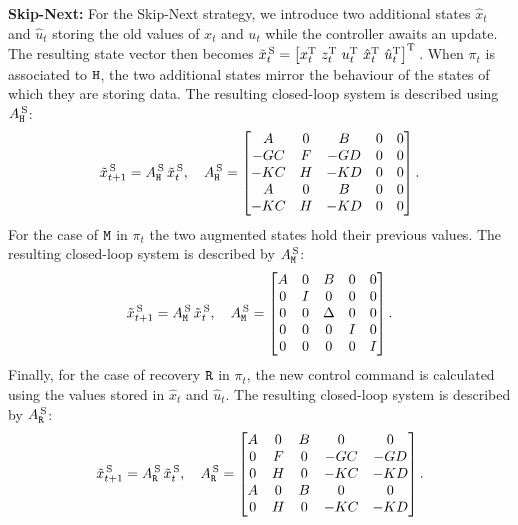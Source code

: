\textbf{Skip-Next: }%
%
For the Skip-Next strategy, we introduce two additional states $\hat x_t$ and $\hat u_t$ storing the old values of $x_t$ and $u_t$ while the controller awaits an update.
The resulting state vector then becomes $\tilde x_t^{\,\text{S}} = \left[ x_t^{\mathrm{\small{T}}}{}\,\,z_t^{\mathrm{\small{T}}}{}\,\, u_t^{\mathrm{\small{T}}}{}\,\, \hat{x}_t^{\mathrm{\small{T}}}{}\,\, \hat{u}_t^{\mathrm{\small{T}}}{} \right]^{\mathrm{\small{T}}}{}$.
When $\pi_t$ is associated to $\texttt{H}$, the two additional states mirror the behaviour of the states of which they are storing data.
The resulting closed-loop system is described using $A^{\,\text{S}}_{\texttt{H}}$:
\begin{equation*}
    \tilde x_{t+1}^{\,\text{S}} = A^{\,\text{S}}_{\texttt{H}}\,\tilde x_t^{\,\text{S}}, \quad
    A^{\,\text{S}}_{\texttt{H}} = \begin{bmatrix}
        A       & 0    & B      & 0 & 0 \\
        -GC   & F  & -GD  & 0 & 0 \\
        -KC   & H  & -KD  & 0 & 0 \\
        A       & 0    & B      & 0 & 0 \\
        -KC   & H  & -KD  & 0 & 0 \\
    \end{bmatrix}.
\end{equation*}
%
For the case of $\texttt{M}$ in $\pi_t$ the two augmented states hold their previous values.
The resulting closed-loop system is described by $A^{\,\text{S}}_{\texttt{M}}$:
%
\begin{equation*}
    \tilde x_{t+1}^{\,\text{S}} = A^{\,\text{S}}_{\texttt{M}}\,\tilde x_t^{\,\text{S}}, \quad
    A^{\,\text{S}}_{\texttt{M}}=\begin{bmatrix}
        A & 0  & B & 0 & 0 \\
        0   & I  & 0   & 0 & 0 \\
        0   & 0  & \Delta   & 0 & 0 \\
        0   & 0  & 0   & I & 0 \\
        0   & 0  & 0   & 0 & I \\
    \end{bmatrix}.
\end{equation*}
%
Finally, for the case of recovery $\texttt{R}$ in $\pi_t$, the new control command is calculated using the values stored in $\hat x_t$ and $\hat u_t$.
The resulting closed-loop system is described by $A^{\,\text{S}}_{\texttt{R}}$:
%
\begin{equation*}
    \tilde x_{t+1}^{\,\text{S}} = A^{\,\text{S}}_{\texttt{R}} \, \tilde x_{t}^{\,\text{S}}, \quad
    A^{\,\text{S}}_{\texttt{R}} = \begin{bmatrix}
        A & 0    & B & 0       & 0 \\
        0   & F  & 0   & -GC & -GD \\
        0   & H  & 0   & -KC & -KD \\
        A & 0    & B & 0       & 0 \\
        0   & H  & 0   & -KC & -KD \\
    \end{bmatrix}.
\end{equation*}
